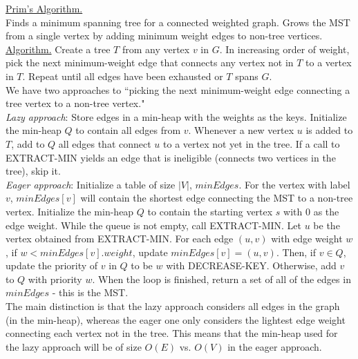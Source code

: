\documentclass[12pt, fleqn]{general}
\begin{document}
\begin{multicols*}{2}
    {\large \underline{Prim's Algorithm.}}\\

    Finds a minimum spanning tree for a connected weighted graph. Grows the MST from a single vertex by adding minimum weight edges to non-tree vertices.\\

    \underline{Algorithm.} Create a tree $T$ from any vertex $v$ in $G$. In increasing order of weight, pick the next minimum-weight edge that connects any vertex not in $T$ to a vertex in $T$. Repeat until all edges have been exhausted or $T$ spans $G$.\\

    We have two approaches to ``picking the next minimum-weight edge connecting a tree vertex to a non-tree vertex."\\

    \emph{Lazy approach}: Store edges in a min-heap with the weights as the keys. Initialize the min-heap $Q$ to contain all edges from $v$. Whenever a new vertex $u$ is added to $T$, add to $Q$ all edges that connect $u$ to a vertex not yet in the tree. If a call to EXTRACT-MIN yields an edge that is ineligible (connects two vertices in the tree), skip it.\\

    \emph{Eager approach}: Initialize a table of size $|V|$, $minEdges$. For the vertex with label $v$, $minEdges[v]$ will contain the shortest edge connecting the MST to a non-tree vertex. Initialize the min-heap $Q$ to contain the starting vertex $s$ with $0$ as the edge weight. While the queue is not empty, call EXTRACT-MIN. Let $u$ be the vertex obtained from EXTRACT-MIN. For each edge $(u, v)$ with edge weight $w$, if $w < minEdges[v].weight$, update $minEdges[v] = (u,v)$. Then,
    if $v \in Q$, update the priority of $v$ in $Q$ to be $w$ with DECREASE-KEY. Otherwise, add $v$ to $Q$ with priority $w$. When the loop is finished, return a set of all of the edges in $minEdges$ - this is the MST.\\

    The main distinction is that the lazy approach considers all edges in the graph (in the min-heap), whereas the eager one only considers the lightest edge weight connecting each vertex not in the tree. This means that the min-heap used for the lazy approach will be of size $O(E)$ vs. $O(V)$ in the eager approach.\\


\end{multicols*}
\end{document}
